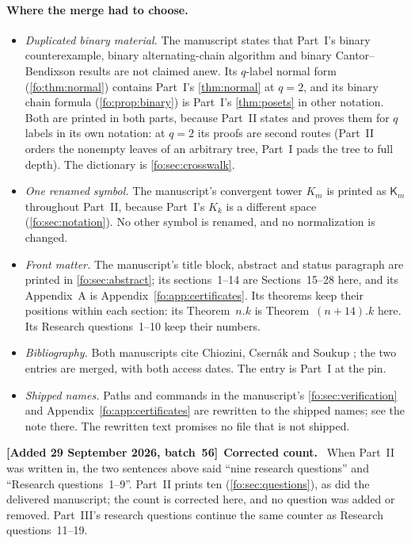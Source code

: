 \documentclass[11pt,letterpaper]{article}
\numberwithin{equation}{section}
\theoremstyle{definition}
\theoremstyle{remark}
\theoremstyle{definition}
\newcommand{\Tw}{\mathsf K}
\newenvironment{writenotec}[1][]{\par\smallskip\begingroup\small\sloppy
 \noindent\textbf{[Added 29 September 2026, batch~56]}\if\relax\detokenize{#1}\relax\else~\textbf{#1.}\fi\ }%
 {\par\endgroup\smallskip}
\begin{document}
\paragraph{Where the merge had to choose.}
\begin{itemize}
\item \emph{Duplicated binary material.} The manuscript states that Part~I's
binary counterexample, binary alternating-chain algorithm and binary
Cantor--Bendixson results are not claimed anew. Its $q$-label normal form
(\cref{fo:thm:normal}) contains Part~I's \cref{thm:normal} at $q=2$, and its
binary chain formula (\cref{fo:prop:binary}) is Part~I's \cref{thm:posets} in
other notation. Both are printed in both parts, because Part~II states and
proves them for $q$ labels in its own notation: at $q=2$ its proofs are second
routes (Part~II orders the nonempty leaves of an arbitrary tree, Part~I pads
the tree to full depth). The dictionary is \cref{fo:sec:crosswalk}.
\item \emph{One renamed symbol.} The manuscript's convergent tower $K_m$ is
printed as $\Tw_m$ throughout Part~II, because Part~I's $K_k$ is a different
space (\cref{fo:sec:notation}). No other symbol is renamed, and no
normalization is changed.
\item \emph{Front matter.} The manuscript's title block, abstract and status
paragraph are printed in \cref{fo:sec:abstract}; its sections~1--14 are
Sections~15--28 here, and its Appendix~A is Appendix~\ref{fo:app:certificates}.
Its theorems keep their positions within each section: its Theorem~$n.k$ is
Theorem~$(n+14).k$ here. Its Research questions~1--10 keep their numbers.
\item \emph{Bibliography.} Both manuscripts cite Chiozini, Csern\'ak and Soukup
\cite{CCS}; the two entries are merged, with both access dates. The entry
\cite{Repo} is Part~I at the pin.
\item \emph{Shipped names.} Paths and commands in the manuscript's
\cref{fo:sec:verification} and Appendix~\ref{fo:app:certificates} are
rewritten to the shipped names; see the note there. The rewritten text
promises no file that is not shipped.
\end{itemize}

\begin{writenotec}[Corrected count]
When Part~II was written in, the two sentences above said ``nine research
questions'' and ``Research questions~1--9''. Part~II prints ten
(\cref{fo:sec:questions}), as did the delivered manuscript; the count is
corrected here, and no question was added or removed. Part~III's research
questions continue the same counter as Research questions~11--19.
\end{writenotec}
\end{document}
